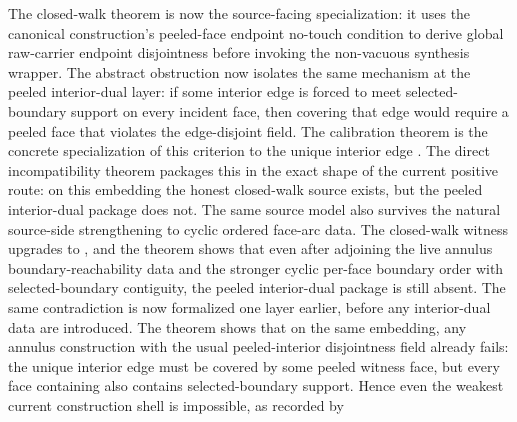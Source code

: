\documentclass[11pt]{article}
\begin{document}
The closed-walk theorem
is now the source-facing specialization: it uses the canonical construction's
peeled-face endpoint no-touch condition to derive global raw-carrier endpoint
disjointness before invoking the non-vacuous synthesis wrapper.  The abstract
obstruction
now isolates the same mechanism at the peeled interior-dual layer: if some
interior edge is forced to meet selected-boundary support on every incident
face, then covering that edge would require a peeled face that violates the
edge-disjoint  field.  The calibration theorem
is the concrete specialization of this criterion to the unique interior edge
.
The direct incompatibility theorem
packages this in the exact shape of the current positive route: on this
embedding the honest closed-walk source exists, but the peeled interior-dual
package does not.
The same source model also survives the natural source-side strengthening to
cyclic ordered face-arc data.  The closed-walk witness upgrades to
, and the theorem
shows that even after adjoining the live annulus boundary-reachability data and
the stronger cyclic per-face boundary order with selected-boundary contiguity,
the peeled interior-dual package is still absent.
The same contradiction is now formalized one layer earlier, before any
interior-dual data are introduced.  The theorem
shows that on the same embedding, any annulus construction with the usual
peeled-interior disjointness field already fails: the unique interior edge
 must be covered by some peeled witness face, but every face
containing  also contains selected-boundary support.  Hence even
the weakest current construction shell
 is impossible,
as recorded by
\end{document}
